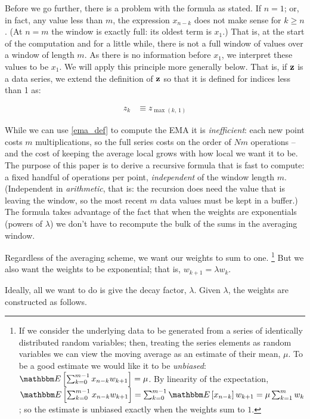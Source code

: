 \documentclass{article}
\newcommand{\E}[1]{\mathbbm E\left[#1\right]}
\begin{document}
Before we go further, there is a problem with the formula as stated.
If $n = 1$; or, in fact, any value less than $m$,
the expression $x_{n-k}$ does not make sense for $k \ge n$.
(At $n = m$ the window is exactly full: its oldest term is $x_1$.)
That is, at the
start of the computation and for a little while, there is not a full window
of values over a window of length $m$. As there is no information before $x_1$,
we interpret these values to be $x_1$.
We will apply this principle more generally below. 
That is, if ${\bf z}$ is a data series,
we extend the definition of ${\bf z}$ so that it is defined for
indices less than 1 as:

\begin{align}
    z_{k} &\equiv  z_{\max(k,\, 1)} \label{o:var_extend}
\end{align}

While we can use \eqref{ema_def} to compute the EMA it is {\em inefficient\/}:
each new point costs $m$ multiplications, so the full series costs on the
order of $N m$ operations -- and the cost of keeping the average local
grows with how local we want it to be. The purpose of this
paper is to derive a recursive formula that is fast to compute: a fixed
handful of operations per point, {\em independent\/} of the window length $m$.
(Independent in {\em arithmetic\/}, that is: the recursion does need the
value that is leaving the window, so the most recent $m$ data values must be
kept in a buffer.)
The formula takes advantage of the fact that when the weights are exponentials
(powers of $\lambda$) we don't have to recompute the bulk of the sums in the
averaging window.

Regardless of the averaging scheme, we want our weights to sum to one.%
\footnote{If we consider the underlying data to be generated from a series of identically distributed random
variables; then, treating the series elements as random variables we can view 
the moving average as an estimate of their mean, $\mu$. 
To be a good estimate we would like it to be {\em unbiased\/}:
$\E{\sum_{k=0}^{m-1} x_{n-k} w_{k+1}} = \mu$. By linearity of the expectation,
$\E{\sum_{k=0}^{m-1} x_{n-k} w_{k+1}} = \sum_{k=0}^{m-1} \E{x_{n-k}}w_{k+1}
= \mu \sum_{k=1}^{m} w_k$; so the estimate is unbiased exactly when the
weights sum to $1$.}
But we also want the weights to be exponential; that is, $w_{k+1} = \lambda w_{k}$.

Ideally, all we want to do is give the decay factor, $\lambda$. Given
$\lambda$, the weights are constructed as follows.
\end{document}
